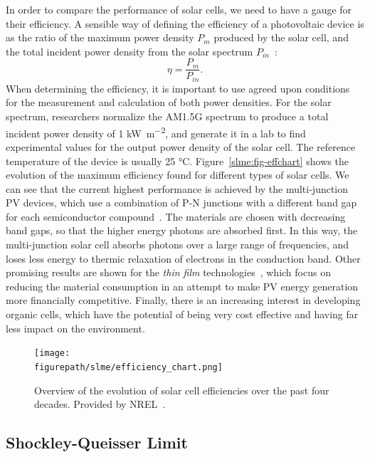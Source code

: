 \begin{refsection}
In order to compare the performance of solar cells, we need to have a gauge 
for their efficiency. A sensible way of defining the efficiency of a 
photovoltaic device is as the ratio of the maximum power density $P_m$ 
produced by the solar cell, and the total incident power density from the 
solar spectrum $P_{in}$~\cite{Fonash2010}: 
\begin{equation} 
\eta = \frac{P_m}{P_{in}}. 
\end{equation} 
When determining the efficiency, it is important to use agreed upon conditions 
for the measurement and calculation of both power densities. For the solar spectrum, 
researchers normalize the AM1.5G spectrum to produce a total incident power 
density of 1 \si{\kilo\watt \per \meter\squared}, and generate it in a lab to find 
experimental values for the output power density of the solar cell. The 
reference temperature of the device is usually 25 \si{\celsius}. 
Figure~\ref{slme:fig-effchart} shows the evolution of the maximum efficiency 
found for different types of solar cells. We can see that the current highest 
performance is achieved by the multi-junction PV devices, which use a 
combination of P-N junctions with a different band gap for each semiconductor 
compound~\cite{Dimroth2007}. The materials are chosen with decreasing band 
gaps, so that the higher energy photons are absorbed first. In this way, the 
multi-junction solar cell absorbs photons over a large range of frequencies, 
and loses less energy to thermic relaxation of electrons in the conduction 
band. Other promising results are shown for the \textit{thin film} 
technologies~\cite{Shah2004}, which focus on reducing the material consumption 
in an attempt to make PV energy generation more financially competitive. 
Finally, there is an increasing interest in developing organic cells, which 
have the potential of being very cost effective and having far less impact on 
the environment. 

\begin{figure}
    \centering
    \texttt{[image: \\figurepath/slme/efficiency\_chart.png]} 
    \caption{\label{slme:fig-effchart} Overview of the evolution of solar cell 
efficiencies over the past four decades. Provided by NREL~\cite{NREL2019}.} 
    \label{fig:awesome_image}
\end{figure}

\subsection{Shockley-Queisser Limit} \label{slme:sec-SQlimit} 
 

\end{refsection}
